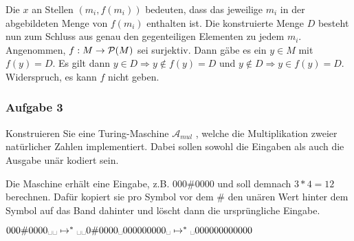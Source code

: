     Die $x$ an Stellen $(m_{i}, f(m_{i}))$ bedeuten, dass das jeweilige $m_{i}$ in der abgebildeten Menge von $f(m_{i})$ enthalten ist. Die konstruierte Menge $D$ besteht nun zum Schluss aus genau den gegenteiligen Elementen zu jedem $m_{i}$.
    Angenommen, $f: M \to \mathcal{P}(M)$ sei surjektiv. Dann gäbe es ein $y \in M$ mit $f(y) = D$. Es gilt dann $y \in D \Rightarrow y \not\in f(y) = D$ und $y \not\in D \Rightarrow y \in f(y) = D$. Widerspruch, es kann $f$ nicht geben.


\subsubsection*{Aufgabe 3}
    Konstruieren Sie eine Turing-Maschine $\mathcal{A}_{mul}$ , welche die Multiplikation zweier natürlicher Zahlen implementiert. Dabei sollen sowohl die Eingaben als auch die Ausgabe unär kodiert sein.

    \LOES Die Maschine erhält eine Eingabe, z.B. $000 \# 0000$ und soll demnach $3 * 4 = 12$ berechnen. Dafür kopiert sie pro Symbol vor dem $\#$ den unären Wert hinter dem Symbol auf das Band dahinter und löscht dann die ursprüngliche Eingabe.

    $000 \# 0000 \blank\blank  \mapsto^{*} \blank\blank 0 \# 0000 \blank 000000000 \blank  \mapsto^{*}  \blank 000000000000$

